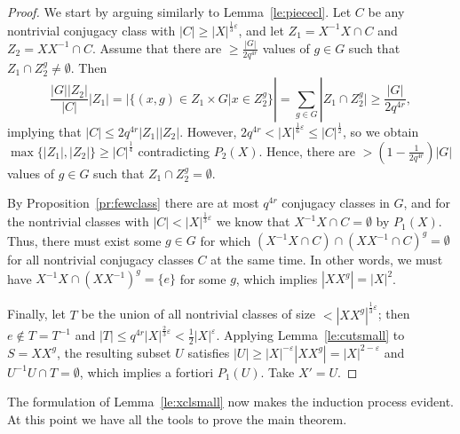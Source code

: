 \documentclass[a4paper]{article}
\theoremstyle{definition}
\numberwithin{equation}{section}
\begin{document}
\begin{proof}
We start by arguing similarly to Lemma~\ref{le:piececl}. Let $C$ be any nontrivial conjugacy class with $|C|\geq|X|^{\frac{1}{3}\varepsilon}$, and let $Z_{1}=X^{-1}X\cap C$ and $Z_{2}=XX^{-1}\cap C$. Assume that there are $\geq\frac{|G|}{2q^{4r}}$ values of $g\in G$ such that $Z_{1}\cap Z_{2}^{g}\neq\emptyset$. Then
\begin{equation*}
\frac{|G||Z_{2}|}{|C|}|Z_{1}|=|\{(x,g)\in Z_{1}\times G|x\in Z_{2}^{g}\}|=\sum_{g\in G}|Z_{1}\cap Z_{2}^{g}|\geq\frac{|G|}{2q^{4r}},
\end{equation*}
implying that $|C|\leq 2q^{4r}|Z_{1}||Z_{2}|$. However, $2q^{4r}<|X|^{\frac{1}{6}\varepsilon}\leq|C|^{\frac{1}{2}}$, so we obtain $\max\{|Z_{1}|,|Z_{2}|\}\geq|C|^{\frac{1}{4}}$ contradicting $P_{2}(X)$. Hence, there are $>\left(1-\frac{1}{2q^{4r}}\right)|G|$ values of $g\in G$ such that $Z_{1}\cap Z_{2}^{g}=\emptyset$.

By Proposition~\ref{pr:fewclass} there are at most $q^{4r}$ conjugacy classes in $G$, and for the nontrivial classes with $|C|<|X|^{\frac{1}{3}\varepsilon}$ we know that $X^{-1}X\cap C=\emptyset$ by $P_{1}(X)$. Thus, there must exist some $g\in G$ for which $(X^{-1}X\cap C)\cap(XX^{-1}\cap C)^{g}=\emptyset$ for all nontrivial conjugacy classes $C$ at the same time. In other words, we must have $X^{-1}X\cap(XX^{-1})^{g}=\{e\}$ for some $g$, which implies $|XX^{g}|=|X|^{2}$.

Finally, let $T$ be the union of all nontrivial classes of size $<|XX^{g}|^{\frac{1}{3}\varepsilon}$; then $e\notin T=T^{-1}$ and $|T|\leq q^{4r}|X|^{\frac{2}{3}\varepsilon}<\frac{1}{2}|X|^{\varepsilon}$. Applying Lemma~\ref{le:cutsmall} to $S=XX^{g}$, the resulting subset $U$ satisfies $|U|\geq|X|^{-\varepsilon}|XX^{g}|=|X|^{2-\varepsilon}$ and $U^{-1}U\cap T=\emptyset$, which implies a fortiori $P_{1}(U)$. Take $X'=U$.
\end{proof}

The formulation of Lemma~\ref{le:xclsmall} now makes the induction process evident. At this point we have all the tools to prove the main theorem.
\end{document}
